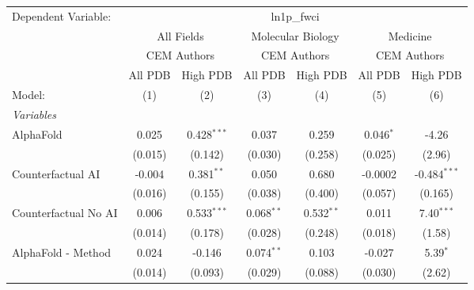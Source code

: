 \begingroup
\centering
\begin{tabular}{lcccccc}
   \tabularnewline \midrule \midrule
   Dependent Variable: & \multicolumn{6}{c}{ln1p\_fwci}\\
 & \multicolumn{2}{c}{All Fields} & \multicolumn{2}{c}{Molecular Biology} & \multicolumn{2}{c}{Medicine} \\
\cmidrule(lr){2-3} \cmidrule(lr){4-5} \cmidrule(lr){6-7}
 & \multicolumn{2}{c}{CEM Authors} & \multicolumn{2}{c}{CEM Authors} & \multicolumn{2}{c}{CEM Authors} \\
\cmidrule(lr){2-3} \cmidrule(lr){4-5} \cmidrule(lr){6-7}
 & \multicolumn{1}{c}{All PDB} & \multicolumn{1}{c}{High PDB} & \multicolumn{1}{c}{All PDB} & \multicolumn{1}{c}{High PDB} & \multicolumn{1}{c}{All PDB} & \multicolumn{1}{c}{High PDB} \\
\cmidrule(lr){2-2} \cmidrule(lr){3-3} \cmidrule(lr){4-4} \cmidrule(lr){5-5} \cmidrule(lr){6-6} \cmidrule(lr){7-7}
   Model:                                                     & (1)          & (2)           & (3)           & (4)          & (5)         & (6)\\  
   \midrule
   \emph{Variables}\\
   AlphaFold                                                  & 0.025        & 0.428$^{***}$ & 0.037         & 0.259        & 0.046$^{*}$ & -4.26\\   
                                                              & (0.015)      & (0.142)       & (0.030)       & (0.258)      & (0.025)     & (2.96)\\   
   Counterfactual AI                                          & -0.004       & 0.381$^{**}$  & 0.050         & 0.680        & -0.0002     & -0.484$^{***}$\\   
                                                              & (0.016)      & (0.155)       & (0.038)       & (0.400)      & (0.057)     & (0.165)\\   
   Counterfactual No AI                                       & 0.006        & 0.533$^{***}$ & 0.068$^{**}$  & 0.532$^{**}$ & 0.011       & 7.40$^{***}$\\   
                                                              & (0.014)      & (0.178)       & (0.028)       & (0.248)      & (0.018)     & (1.58)\\   
   AlphaFold - Method                                         & 0.024        & -0.146        & 0.074$^{**}$  & 0.103        & -0.027      & 5.39$^{*}$\\   
                                                              & (0.014)      & (0.093)       & (0.029)       & (0.088)      & (0.030)     & (2.62)\\   

\end{tabular}
